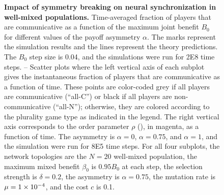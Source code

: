 \documentclass[pdflatex,lineno,referee,sn-nature]{sn-jnl}
\begin{document}
\begin{figure}
  \centering
  \begin{subcaptiongroup}
      {\label{fig:time-series_well-mixed_alpha-1}\captiontext*{}}{%
      {\label{fig:time-series_well-mixed_alpha-075}\captiontext*{}}{%
      {\label{fig:time-series_well-mixed_alpha-0}\captiontext*{}}{%
      {\label{fig:multi-comm-frac}\captiontext*{}}{%
    {}%
  }}}}
  \end{subcaptiongroup}
  \caption{
    \textbf{
      Impact of symmetry breaking on neural synchronization
      in well-mixed populations.
    }
    Time-averaged fraction of players that are communicative as a function
    of the maximum joint benefit $B_0$
    for different values of the payoff asymmetry $\alpha$.
    The marks represent the simulation results
    and the lines represent the theory predictions.
    The $B_0$ step size is \num{0.04},
    and the simulations were run for \num{2E8} time steps.
    --
    Scatter plots where
    the left vertical axis of each subplot gives
    the instantaneous fraction of players that are communicative
    as a function of time.
    These points are color-coded
    grey if all players are communicative (``all-C'') or
    black if all players are non-communicative (``all-N'');
    otherwise, they are colored according
    to the plurality game type as indicated in the legend.
    The right vertical axis corresponds to the order parameter $\rho$
    (), in magenta, as a function of time.
    The asymmetry is
    $\alpha = 0$,
    $\alpha = 0.75$,
    and
    $\alpha = 1$,
    and the simulation were run for \num{8E5} time steps.
    For all four subplots,
    the network topologies are the
    $N=20$ well-mixed population,
    the maximum mixed benefit $\beta_0$ is $\num{0.95} B_0$ at each step,
    the selection strength is $\delta=0.2$,
    the asymmetry is $\alpha=0.75$,
    the mutation rate is $\mu=\num{1E-4}$,
    and
    the cost $c$ is \num{0.1}.
  }
  \label{fig:well-mixed}
\end{figure}
\end{document}
